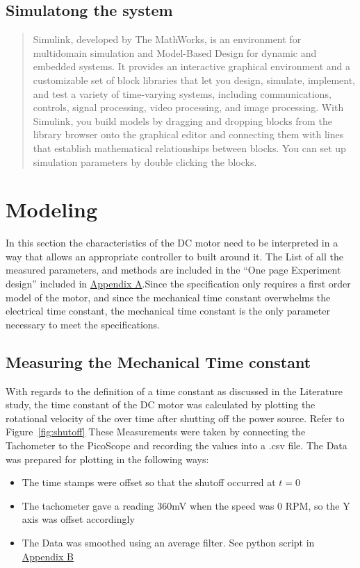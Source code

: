\section{Simulatong the system}
\blockquote{Simulink, developed by The MathWorks, is an environment for multidomain simulation and
Model-Based Design for dynamic and embedded systems. It provides an interactive
graphical environment and a customizable set of block libraries that let you design, simulate,
implement, and test a variety of time-varying systems, including communications, controls,
signal processing, video processing, and image processing.
With Simulink, you build models by dragging and dropping blocks from the library browser
onto the graphical editor and connecting them with lines that establish mathematical
relationships between blocks. You can set up simulation parameters by double clicking the
blocks.\\
\cite[p.4]{li2008simulink}}




\chapter{Modeling}
In this section the characteristics of the DC motor need to be interpreted in a way that allows an appropriate controller to built around it. The List of all the measured parameters, and methods are included in the ``One page Experiment design'' included in \hyperref[apx:A]{Appendix A}.Since the specification only requires a first order model of the motor, and since the mechanical time constant overwhelms the electrical time constant, the mechanical time constant is the only parameter necessary to meet the specifications.
\section{Measuring the Mechanical Time constant}
With regards to the definition of a time constant as discussed in the Literature study, the time constant of the DC motor was calculated by plotting the rotational velocity of the over time after shutting off the power source. Refer to Figure~\ref{fig:shutoff}
These Measurements were taken by connecting the Tachometer to the PicoScope and recording the values into a .csv file. The Data was prepared for plotting in the following ways:
\begin{itemize}
	\item The time stamps were offset so that the shutoff occurred at $t=0$ 
	\item The tachometer gave a reading 360mV when the speed was 0 RPM, so the Y axis was offset accordingly
	\item The Data was smoothed using an average filter. See python script in \hyperref[apx:B]{Appendix B}
\end{itemize}

